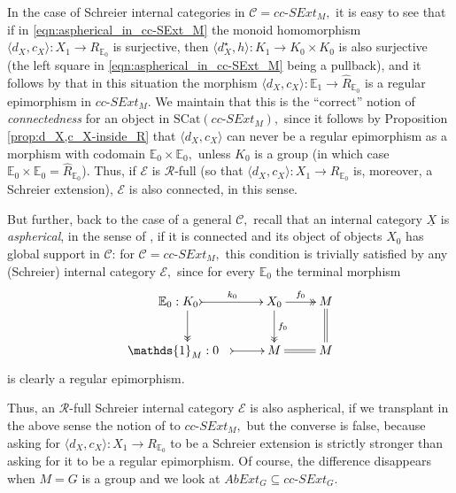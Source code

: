 \documentclass[a4paper]{amsart}
\theoremstyle{plain}
\theoremstyle{definition}
\theoremstyle{remark}
\newcommand{\la}{\langle}
\newcommand{\ra}{\rangle}
\begin{document}
In the case of Schreier internal categories in $\mathcal{C}= cc\text{-}SExt_M,$ it is easy to see that if in \eqref{eqn:aspherical_in_cc-SExt_M} the monoid homomorphism $\la d_X,c_X\ra\colon X_1\longrightarrow R_{{\mathbb{E}}_0}$ is surjective, then $\la d^\star_X,h\ra\colon K_1\rightarrow K_0\times K_0$ is also surjective (the left square in \eqref{eqn:aspherical_in_cc-SExt_M} being a pullback), and it follows by \cite[Proposition A.4]{AMR} that in this situation the morphism $\la d_X,c_X\ra\colon{\mathbb{E}}_1\rightarrow\widehat{R}_{{\mathbb{E}}_0}$ is a regular epimorphism in $cc\text{-}SExt_M.$ We maintain that this is the ``correct'' notion of \emph{connectedness} for an object in $\mathrm{SCat}(cc\text{-}SExt_M),$ since it follows by Proposition \ref{prop:d_X,c_X-inside_R} that $\la d_X,c_X\ra$ can never be a regular epimorphism as a morphism with codomain ${\mathbb{E}}_0\times{\mathbb{E}}_0,$ unless $K_0$ is a group (in which case ${\mathbb{E}}_0\times{\mathbb{E}}_0=\widehat{R}_{{\mathbb{E}}_0}$). Thus, if $\mathcal{E}$ is $\mathcal{R}$-full (so that $\la d_X,c_X\ra\colon X_1\longrightarrow R_{{\mathbb{E}}_0}$ is, moreover, a Schreier extension), $\mathcal{E}$ is also connected, in this sense.

But further, back to the case of a general $\mathcal{C},$ recall that an internal category $\underline{X}$ is \emph{aspherical}, in the sense of \cite{aspherical}, if it is connected and its object of objects $X_0$ has global support in $\mathcal{C}$: for $\mathcal{C}= cc\text{-}SExt_M,$ this condition is trivially satisfied by any (Schreier) internal category $\mathcal{E},$ since for every ${\mathbb{E}}_0$ the terminal morphism
\begin{equation*}
\xymatrix{
{{\mathbb{E}}_0:K_0} \ar@<1.7ex>@{->>}[d] \ar@{>->}[r]^-{k_0} &{X_0} \ar@{->>}[d]^-{f_0} \ar@{->>}[r]^-{f_0} &M \ar@{=}[d]\\
{{\mathds{1}}_M:0 \hspace{0.3cm} } \ar@{>->}[r] &{M} \ar@{=}[r] &{M}
}
\end{equation*}
is clearly a regular epimorphism.

Thus, an $\mathcal{R}$-full Schreier internal category $\mathcal{E}$ is also aspherical, if we transplant in the above sense the notion of \cite{aspherical} to $cc\text{-}SExt_M,$ but the converse is false, because asking for $\la d_X,c_X\ra\colon X_1\longrightarrow R_{{\mathbb{E}}_0}$ to be a Schreier extension is strictly stronger than asking for it to be a regular epimorphism. Of course, the difference disappears when $M=G$ is a group and we look at $AbExt_G\subseteq cc\text{-}SExt_G.$
\end{document}
